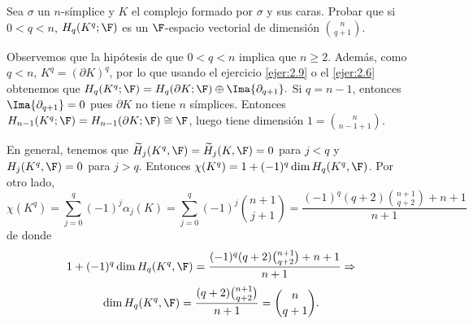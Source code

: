 \documentclass[twoside]{article}
\begin{document}
\newpage

\begin{ejercicio}{2.13}
Sea $σ$ un $n$-símplice y $K$ el complejo formado por $σ$ y sus caras. Probar
que si $0 < q < n$, $H_q(K^q; \F)$ es un $\F$-espacio vectorial de dimensión $\binom{n}{q+1}$.
\end{ejercicio}
\begin{solucion}
Observemos que la hipótesis de que $0<q<n$ implica que $n\geq 2$. Además, como $q<n$, $K^q=(\partial K)^q$, por lo que usando el ejercicio \ref{ejer:2.9} o el \ref{ejer:2.6} obtenemos que $H_q(K^q; \F)=H_q(\partial K; \F)\oplus\Ima{\partial_{q+1}}.$ Si $q=n-1$, entonces $\Ima{\partial_{q+1}}=0$ pues $\partial K$ no tiene $n$ símplices. Entonces $H_{n-1}(K^q; \F)=H_{n-1}(\partial K; \F)\cong\F$, luego tiene dimensión $1=\binom{n}{n-1+1}$. 

%
%

En general, tenemos que $\widetilde{H}_j(K^q,\F)=\widetilde{H}_j(K,\F)=0$ para $j<q$ y $H_j(K^q,\F)=0$ para $j>q$. Entonces $\chi(K^q)=1+(-1)^q\dim H_q(K^q,\F)$. Por otro lado, 
\[
\chi(K^q)=\sum_{j=0}^q (-1)^j\alpha_j(K)=\sum_{j=0}^q (-1)^j\binom{n+1}{j+1}=\frac{(-1)^q (q + 2) \binom{n + 1}{ q + 2} + n + 1}{n + 1}
\]
de donde 
\[
1+(-1)^q\dim H_q(K^q,\F)=\frac{(-1)^q (q + 2) \binom{n + 1}{ q + 2} + n + 1}{n + 1}\Rightarrow
\]
\[
\dim H_q(K^q,\F)=\frac{ (q + 2) \binom{n + 1}{ q + 2}}{n + 1}=\binom{n}{q+1}.
\]

\end{solucion}

\newpage
\end{document}
